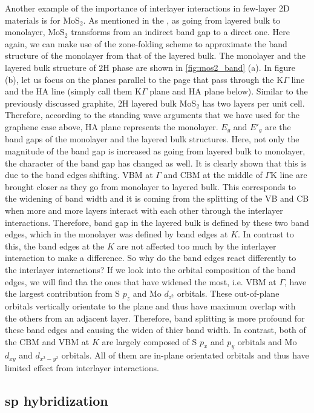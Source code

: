 Another example of the importance of interlayer interactions in few-layer 2D materials is for MoS$_2$. As mentioned in the , as going from layered bulk to monolayer, MoS$_2$ transforms from an indirect band gap to a direct one. Here again, we can make use of the zone-folding scheme to approximate the band structure of the monolayer from that of the layered bulk. The monolayer and the layered bulk structure of 2H phase are shown in \autoref{fig:mos2_band} (a). In figure (b), let us focus on the planes parallel to the page that pass through the K$\Gamma$ line and the HA line (simply call them K$\Gamma$ plane and HA plane below). Similar to the previously discussed graphite, 2H layered bulk MoS$_2$ has two layers per unit cell. Therefore, according to the standing wave arguments that we have used for the graphene case above, HA plane represents the monolayer. $E_g$ and $E\prime_g$ are the band gaps of the monolayer and the layered bulk structures. Here, not only the magnitude of the band gap is increased as going from layered bulk to monolayer, the character of the band gap has changed as well. It is clearly shown that this is due to the band edges shifting. VBM at $\Gamma$ and CBM at the middle of $\Gamma$K line are brought closer as they go from monolayer to layered bulk. This corresponds to the widening of band width and it is coming from the splitting of the VB and CB when more and more layers interact with each other through the interlayer interactions. Therefore, band gap in the layered bulk is defined by these two band edges, which in the monolayer was defined by band edges at $K$. In contrast to this, the band edges at the $K$ are not affected too much by the interlayer interaction to make a difference. So why do the band edges react differently to the interlayer interactions? If we look into the orbital composition of the band edges, we will find tha the ones that have widened the most, i.e. VBM at $\Gamma$, have the largest contribution from S $p_z$ and Mo $d_{z^2}$ orbitals. These out-of-plane orbitals vertically orientate to the plane and thus have maximum overlap with the others from an adjacent layer. Therefore, band splitting is more profound for these band edges and causing the widen of thier band width. In contrast, both of the CBM and VBM at $K$ are largely composed of S $p_x$ and $p_y$ orbitals and Mo $d_{xy}$ and $d_{x^2-y^2}$ orbitals. All of them are in-plane orientated orbitals and thus have limited effect from interlayer interactions\cite{Padilha2014}.

\subsection{sp hybridization\label{sphyb}}

